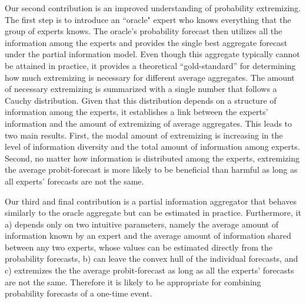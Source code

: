 \documentclass[11pt]{article}
\theoremstyle{definition}
\theoremstyle{definition}
\begin{document}
Our second contribution is an improved understanding of probability extremizing. The first step is to introduce an ``oracle" expert who knows everything that the group of experts knows. The oracle's probability forecast then utilizes all the information among the experts and provides the single best aggregate forecast under the partial information model. Even though this aggregate typically cannot be attained in practice, it provides a theoretical ``gold-standard'' for determining how much extremizing is necessary for different average aggregates. The amount of necessary extremizing is summarized with a single number that follows a Cauchy distribution. Given that this distribution depends on a structure of information among the experts, 
it establishes a link between the experts' information and the amount of extremizing of average aggregates. This leads to two main results. First, the modal amount of extremizing is increasing in the level of information diversity and the total amount of information among experts. Second, no matter how information is distributed among the experts, extremizing the average probit-forecast is more likely to be beneficial than harmful as long as all experts' forecasts are not the same. 



Our third and final contribution is a partial information aggregator that behaves similarly to the oracle aggregate but can be estimated in practice. Furthermore, it a) depends only on two intuitive parameters, namely the average amount of information known by an expert and the average amount of information shared between any two experts, whose values can be estimated directly from the probability forecasts, b) can leave the convex hull of the individual forecasts, and c) extremizes the the average probit-forecast as long as all the experts' forecasts are not the same.  Therefore it is likely to be appropriate for combining probability forecasts of a one-time event.


\end{document}
